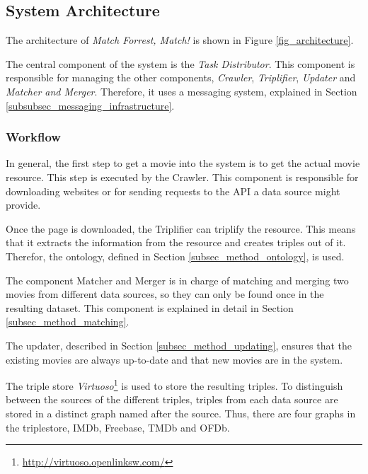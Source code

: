 \subsection{System Architecture}
\label{subsec_method_architecture}

The architecture of \emph{Match Forrest, Match!} is shown in Figure \ref{fig_architecture}.

The central component of the system is the \textit{Task Distributor}.
This component is responsible for managing the other components, \textit{Crawler}, \textit{Triplifier}, \textit{Updater} and \textit{Matcher and Merger}.
Therefore, it uses a messaging system, explained in Section \ref{subsubsec_messaging_infrastructure}.

\subsubsection{Workflow}
\label{subsubsec_workflow}

In general, the first step to get a movie into the system is to get the actual movie resource.
This step is executed by the Crawler.
This component is responsible for downloading websites or for sending requests to the API a data source might provide.

Once the page is downloaded, the Triplifier can triplify the resource.
This means that it extracts the information from the resource and creates triples out of it.
Therefor, the ontology, defined in Section \ref{subsec_method_ontology}, is used.

The component Matcher and Merger is in charge of matching and merging two movies from different data sources, so they can only be found once in the resulting dataset.
This component is explained in detail in Section \ref{subsec_method_matching}.

The updater, described in Section \ref{subsec_method_updating}, ensures that the existing movies are always up-to-date and that new movies are in the system.

The triple store \emph{Virtuoso}\footnote{\url{http://virtuoso.openlinksw.com/}} is used to store the resulting triples.
To distinguish between the sources of the different triples, triples from each data source are stored in a distinct graph named after the source.
Thus, there are four graphs in the triplestore, IMDb, Freebase, TMDb and OFDb.

